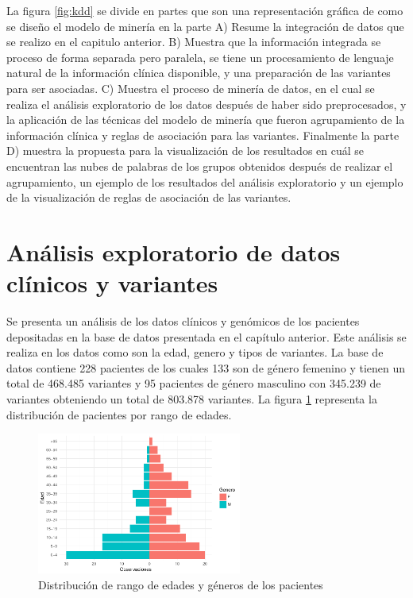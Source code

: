  La figura \ref{fig:kdd} se divide en partes que son una representación gráfica de como se diseño el modelo de minería en la  parte A) Resume la integración de datos que se realizo en el capitulo anterior. B) Muestra que la información integrada se proceso de forma separada pero paralela, se tiene un procesamiento de lenguaje natural de la información clínica disponible, y una preparación de las variantes para ser asociadas. C) Muestra el proceso de minería de datos, en el cual se realiza el análisis exploratorio de los datos después de haber sido preprocesados, y la aplicación de las técnicas del modelo de minería que fueron agrupamiento de la información clínica y reglas de asociación para las variantes. Finalmente la parte D) muestra la propuesta para la visualización de los resultados en cuál se encuentran las nubes de palabras de los grupos obtenidos después de realizar el agrupamiento, un ejemplo de los resultados del análisis exploratorio y un ejemplo de la visualización de reglas de asociación de las variantes.



\section{Análisis exploratorio de datos clínicos y variantes}

Se presenta un análisis de los datos clínicos  y genómicos de los pacientes depositadas en la base de datos presentada en el capítulo anterior. Este análisis se realiza en los datos como son la edad, genero y tipos de variantes. La base de datos contiene 228 pacientes de los cuales 133 son de género femenino y tienen un total de 468.485 variantes y 95 pacientes de género masculino con 345.239 de variantes obteniendo  un total de 803.878 variantes. La  figura \ref{fig:general} representa la distribución de pacientes por rango de edades.\\

\begin{figure}[h]
	\centering
	\includegraphics[width=0.6\textwidth]{Kap4/general}
	\caption{Distribución de rango de edades y géneros de los pacientes}
	\label{fig:general}
\end{figure}

